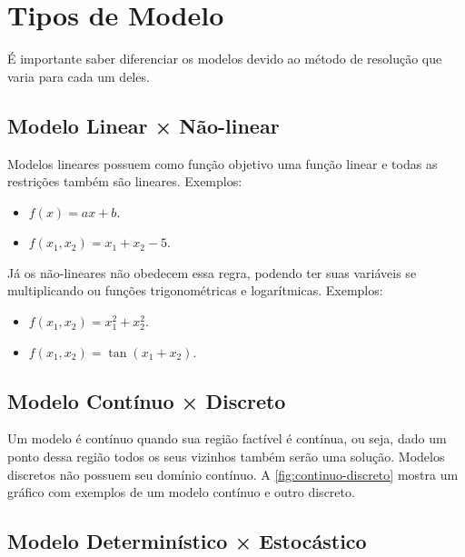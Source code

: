 \section{Tipos de Modelo}\label{sec:tipos-de-modelo}

É importante saber diferenciar os modelos devido ao método de resolução que varia para cada um deles.

\subsection{Modelo Linear × Não-linear}\label{subsec:modelo-linear}


Modelos lineares possuem como função objetivo uma função linear e todas as restrições também são lineares.
Exemplos:

\begin{itemize}
    \item $f(x) = ax + b$.
    \item $f(x_1, x_2) = x_1 + x_2 - 5$.
\end{itemize}

Já os não-lineares não obedecem essa regra, podendo ter suas variáveis se multiplicando ou funções trigonométricas e logarítmicas.
Exemplos:

\begin{itemize}
    \item $f(x_1, x_2) = x_1^2 + x_2^2$.
    \item $f(x_1, x_2) = \tan(x_1 + x_2)$.
\end{itemize}

\subsection{Modelo Contínuo × Discreto}\label{subsec:modelo-continuo-x-discreto}

Um modelo é contínuo quando sua região factível é contínua, ou seja, dado um ponto dessa região todos os seus vizinhos também serão uma solução.
Modelos discretos não possuem seu domínio contínuo.
A \autoref{fig:continuo-discreto} mostra um gráfico com exemplos de um modelo contínuo e outro discreto.



\subsection{Modelo Determinístico × Estocástico}\label{subsec:modelo-deterministico-x-estocastico}

